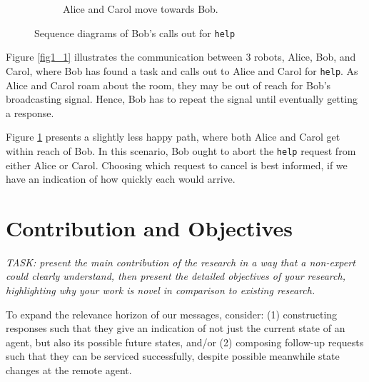 \documentclass[conference]{IEEEtran}
\begin{document}
\begin{figure}
\begin{subfigure}{0.4\textwidth}
\caption{Alice and Carol move towards Bob.}
\label{fig1_2}
\end{subfigure}
\caption{Sequence diagrams of Bob's calls out for
\label{fig1}
\texttt{help}}
\end{figure}

Figure \ref{fig1_1} illustrates the communication between 3 robots,
Alice, Bob, and Carol, where Bob has found a task and calls out to
Alice and Carol for \texttt{help}. As Alice and Carol roam about the
room, they may be out of reach for Bob's broadcasting signal. Hence,
Bob has to repeat the signal until eventually getting a response.

Figure \ref{fig1_2} presents a slightly less happy path, where both
Alice and Carol get within reach of Bob. In this scenario, Bob ought
to abort the \texttt{help} request from either Alice or Carol.
Choosing which request to cancel is best informed, if we have an
indication of how quickly each would arrive.

\section{Contribution and Objectives}

\emph{TASK: present the main contribution of the research in a way
that a non-expert could clearly understand, then present the detailed
objectives of your research, highlighting why your work is novel in
comparison to existing research.}

To expand the relevance horizon of our messages, consider: (1)
constructing responses such that they give an indication of not just
the current state of an agent, but also its possible future states,
and/or (2) composing follow-up requests such that they can be serviced
successfully, despite possible meanwhile state changes at the remote
agent.
\end{document}
